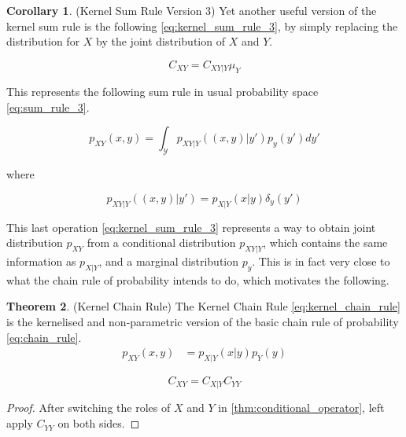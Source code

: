 \documentclass[twoside]{article} \usepackage{aistats2017}
\theoremstyle{definition}
\newtheorem{theorem}{Theorem}[section]
\newtheorem{corollary}[theorem]{Corollary}
\newcommand{\rv}[1]{{#1}}
\newcommand{\muY}{\mu_{\rv{Y}}}
\newcommand{\Cxy}{C_{\rv{X} \rv{Y}}}
\newcommand{\Cyy}{C_{\rv{Y} \rv{Y}}}
\newcommand{\Cxly}{C_{\rv{X} | \rv{Y}}}
\begin{document}
		\begin{corollary} \label{thm:kernel_sum_rule_3}
			(Kernel Sum Rule Version 3)
			Yet another useful version of the kernel sum rule is the following \eqref{eq:kernel_sum_rule_3}, by simply replacing the distribution for $\rv{X}$ by the joint distribution of $\rv{X}$ and $\rv{Y}$.
		
			\begin{equation}
				\Cxy = C_{\rv{X} \rv{Y} | \rv{Y}} \muY
			\label{eq:kernel_sum_rule_3}
			\end{equation}
			
			This represents the following sum rule in usual probability space \eqref{eq:sum_rule_3}.
			
			\begin{equation}
				p_{\rv{X} \rv{Y}}(x, y) = \int_{\mathcal{Y}} p_{\rv{X} \rv{Y} | \rv{Y}}((x, y) | y') p_{\rv{y}}(y') dy'
			\label{eq:sum_rule_3}
			\end{equation}
			
			where
			
			\begin{equation}
			p_{\rv{X} \rv{Y} | \rv{Y}}((x, y) | y') = p_{\rv{X} | \rv{Y}}(x| y) \delta_{y}(y')
			\end{equation}
		\end{corollary}
		
		This last operation \eqref{eq:kernel_sum_rule_3} represents a way to obtain joint distribution $p_{\rv{X} \rv{Y}}$ from a conditional distribution $p_{\rv{X} \rv{Y} | \rv{Y}}$, which contains the same information as $p_{\rv{X} | \rv{Y}}$, and a marginal distribution $p_{\rv{y}}$. This is in fact very close to what the chain rule of probability intends to do, which motivates the following.
	
		\begin{theorem} \label{thm:kernel_chain_rule}
			(Kernel Chain Rule)
			The Kernel Chain Rule \eqref{eq:kernel_chain_rule} is the kernelised and non-parametric version of the basic chain rule of probability \eqref{eq:chain_rule}.
			\begin{equation}
			\begin{aligned}
				p_{\rv{X} \rv{Y}}(x, y) &= p_{\rv{X} | \rv{Y}}(x | y) p_{\rv{Y}}(y)
			\label{eq:chain_rule}
			\end{aligned}
			\end{equation}	

			\begin{equation}
				\Cxy = \Cxly \Cyy
			\label{eq:kernel_chain_rule}
			\end{equation}
			
			\begin{proof}
				After switching the roles of $\rv{X}$ and $\rv{Y}$ in \cref{thm:conditional_operator}, left apply $\Cyy$ on both sides.
			\end{proof}
		\end{theorem}
\end{document}
